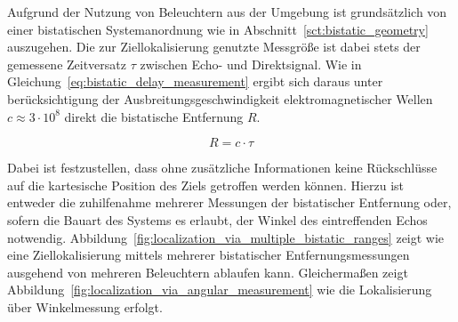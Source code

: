 Aufgrund der Nutzung von Beleuchtern aus der Umgebung ist grundsätzlich von einer bistatischen Systemanordnung wie in Abschnitt~\ref{sct:bistatic_geometry} auszugehen. Die zur Ziellokalisierung genutzte Messgröße ist dabei stets der gemessene Zeitversatz \(\tau \) zwischen Echo- und Direktsignal. Wie in Gleichung~\ref{eq:bistatic_delay_measurement} ergibt sich daraus unter berücksichtigung der Ausbreitungsgeschwindigkeit elektromagnetischer Wellen \(c \approx 3\cdot10^8\) direkt die bistatische Entfernung \(R\).

\begin{equation}
    R = c \cdot \tau
\end{equation}\label{eq:bistatic_delay_measurement}

Dabei ist festzustellen, dass ohne zusätzliche Informationen keine Rückschlüsse auf die kartesische Position des Ziels getroffen werden können. Hierzu ist entweder die zuhilfenahme mehrerer Messungen der bistatischer Entfernung oder, sofern die Bauart des Systems es erlaubt, der Winkel des eintreffenden Echos notwendig. Abbildung~\ref{fig:localization_via_multiple_bistatic_ranges} zeigt wie eine Ziellokalisierung mittels mehrerer bistatischer Entfernungsmessungen ausgehend von mehreren Beleuchtern ablaufen kann. Gleichermaßen zeigt Abbildung~\ref{fig:localization_via_angular_measurement} wie die Lokalisierung über Winkelmessung erfolgt.

